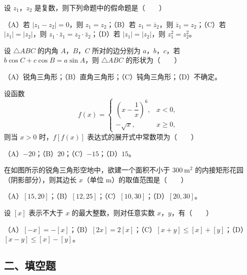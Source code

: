 \begin{question}
设 $z_1$，$z_2$ 是复数，则下列命题中的假命题是\mbox{（　　）}

（A）若 $|z_1-z_2|=0$，则 $z_1=z_2$；（B）若 $z_1=\bar z_2$，则 $\bar z_1=z_2$；（C）若 $|z_1|=|z_2|$，则 $z_1\cdot\bar z_1=z_2\cdot\bar z_2$；（D）若 $|z_1|=|z_2|$，则 $z_1^2=z_2^2$。

\end{question}
\begin{question}
设 $\triangle ABC$ 的内角 $A$，$B$，$C$ 所对的边分别为 $a$，$b$，$c$，若 $b\cos C+c\cos B=a\sin A$，则 $\triangle ABC$ 的形状为\mbox{（　　）}

（A）锐角三角形；（B）直角三角形；（C）钝角三角形；（D）不确定。

\end{question}
\begin{question}
设函数
\nopagebreak[4]
\[f(x)=\begin{cases}
\left(x-\dfrac1x\right)^6,&x<0,\\[6pt]
-\sqrt x,&x\geqslant0,
\end{cases}\]
则当 $x>0$ 时，$f[f(x)]$ 表达式的展开式中常数项为\mbox{（　　）}

（A）$-20$；（B）$20$；（C）$-15$；（D）$15$。

\Needspace{0.4\textheight}
\end{question}
\begin{question}
在如图所示的锐角三角形空地中，欲建一个面积不小于 $300\ \mathrm{m}^2$ 的内接矩形花园（阴影部分），则其边长 $x$（单位 m）的取值范围是\mbox{（　　）}
\nopagebreak[4]
\begin{center}\end{center}
\nopagebreak[4]
（A）$[15,20]$；（B）$[12,25]$；（C）$[10,30]$；（D）$[20,30]$。

\end{question}
\begin{question}
设 $[x]$ 表示不大于 $x$ 的最大整数，则对任意实数 $x$，$y$，有\mbox{（　　）}

（A）$[-x]=-[x]$；（B）$[2x]=2[x]$；（C）$[x+y]\leqslant[x]+[y]$；（D）$[x-y]\leqslant[x]-[y]$。

\end{question}
\begingroup
\renewcommand{\gkpart}[1]{\Needspace{0.2\textheight}\subsection*{#1}\nopagebreak}
\gkpart{二、填空题}
\endgroup


